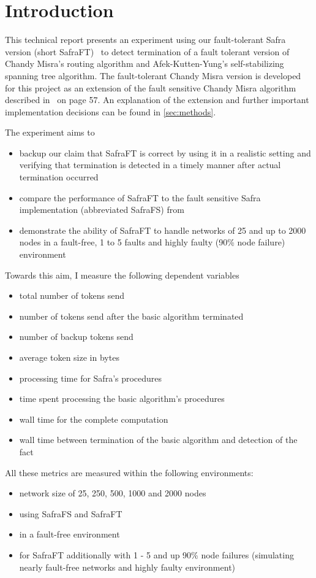 \section{Introduction}
This technical report presents an experiment using our fault-tolerant Safra version (short SafraFT)~\cite{safraFT2018}
to detect termination of a fault tolerant version of Chandy Misra's routing algorithm and Afek-Kutten-Yung's self-stabilizing spanning tree algorithm.
The fault-tolerant Chandy Misra version is developed for this project as an extension of the fault sensitive Chandy Misra algorithm described in~\cite{fokkink:2018} on page 57.
An explanation of the extension and further important implementation decisions can be found in \cref{sec:methods}.

The experiment aims to
\begin{itemize}
	\item backup our claim that SafraFT is correct by using it in a realistic setting and verifying that termination is detected in a timely manner after actual termination occurred
	\item compare the performance of SafraFT to the fault sensitive Safra implementation (abbreviated SafraFS) from \cite{demirbas2000optimal}
	\item demonstrate the ability of SafraFT to handle networks of 25 and up to 2000 nodes in a fault-free, 1 to 5 faults and highly faulty (90\% node failure) environment
\end{itemize}

Towards this aim, I measure the following dependent variables
\begin{itemize}
	\item total number of tokens send
	\item number of tokens send after the basic algorithm terminated
	\item number of backup tokens send
	\item average token size in bytes
	\item processing time for Safra's procedures
	\item time spent processing the basic algorithm's procedures
	\item wall time for the complete computation
	\item wall time  between termination of the basic algorithm and detection of the fact
\end{itemize}

All these metrics are measured within the following environments:
\begin{itemize}
	\item network size of 25, 250, 500, 1000 and 2000 nodes
	\item using SafraFS and SafraFT
	\item in a fault-free environment
	\item for SafraFT additionally with 1 - 5 and up 90\% node failures (simulating nearly fault-free networks and highly faulty environment)
\end{itemize}

